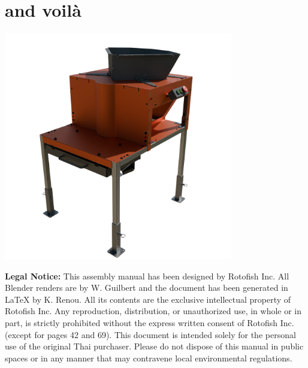 


\noindent
\begin{minipage}[t]{0.12\textwidth}
    \vspace*{-\topskip} %
\end{minipage}%
\hfill
\begin{minipage}[t]{0.7\textwidth}
    \vspace*{-\topskip}
    \section*{and voilà}
\end{minipage}%




\vspace{1em}

\begin{center}
    \includegraphics[height=10cm]{../images/general_vue.png}
\end{center}

\vspace{0.7em}

\begin{tcolorbox}[colback=gray!05, colframe=gray!60, boxrule=0.5pt, left=2mm, right=2mm, title=]
\textbf{Legal Notice:} This assembly manual has been designed by Rotofish Inc. All Blender renders are by W. Guilbert and the document has been generated in LaTeX by K. Renou. All its contents are the exclusive intellectual property of Rotofish Inc. Any reproduction, distribution, or unauthorized use, in whole or in part, is strictly prohibited without the express written consent of Rotofish Inc. (except for pages 42 and 69). This document is intended solely for the personal use of the original Thai purchaser. Please do not dispose of this manual in public spaces or in any manner that may contravene local environmental regulations. 
\end{tcolorbox}


